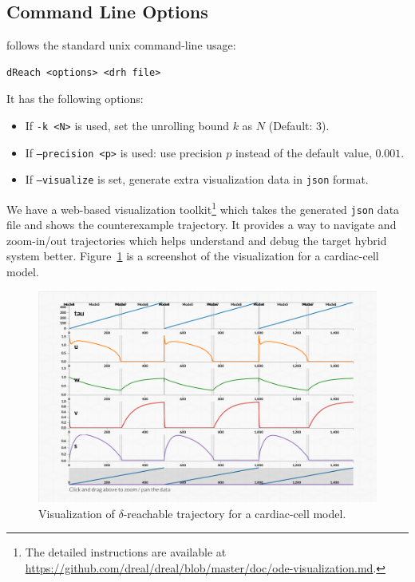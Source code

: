 \subsection{Command Line Options}
\dReach{} follows the standard unix command-line usage:
\begin{Verbatim}[fontfamily=courier, framesep=1mm, fontsize=\small]
dReach <options> <drh file>
\end{Verbatim}
It has the following options:
\begin{itemize}
\item If \texttt{-k <N>} is used, set the unrolling bound $k$ as $N$
  (Default: 3).
\item If \texttt{--precision <p>} is used: use precision $p$ instead of
  the default value, $0.001$.
\item If \texttt{--visualize} is set, \dReach{} generate extra
  visualization data in \texttt{json} format.
\end{itemize}
We have a web-based visualization toolkit\footnote{The detailed
  instructions are available at
  \url{https://github.com/dreal/dreal/blob/master/doc/ode-visualization.md}.}
which takes the generated \texttt{json} data file and shows the
counterexample trajectory. It provides a way to navigate and
zoom-in/out trajectories which helps understand and debug the target
hybrid system better. Figure~\ref{fig:viz} is a screenshot of the
visualization for a cardiac-cell model.
\begin{figure}
  \centering
  \includegraphics[width=\textwidth]{images/cardiac}
  \caption{Visualization of $\delta$-reachable trajectory for
    a cardiac-cell model.}
  \label{fig:viz}
\end{figure}

